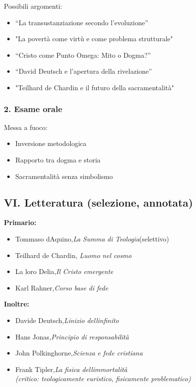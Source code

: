 \documentclass[
]{article}
\begin{document}
Possibili argomenti:

\begin{itemize}
\item
  ``La transustanziazione secondo l'evoluzione''
\item
  "La povertà come virtù e come problema strutturale"
\item
  ``Cristo come Punto Omega: Mito o Dogma?''
\item
  ``David Deutsch e l'apertura della rivelazione''
\item
  "Teilhard de Chardin e il futuro della sacramentalità"
\end{itemize}

\subsubsection{\texorpdfstring{\textbf{2. Esame orale}}{2. Esame orale}}\label{esame-orale}

Messa a fuoco:

\begin{itemize}
\item
  Inversione metodologica
\item
  Rapporto tra dogma e storia
\item
  Sacramentalità senza simbolismo
\end{itemize}

\subsection{\texorpdfstring{\textbf{VI. Letteratura (selezione, annotata)}}{VI. Letteratura (selezione, annotata)}}\label{vi.-letteratura-selezione-annotata}

\textbf{Primario:}

\begin{itemize}
\item
  Tommaso d\textquotesingle Aquino,\emph{La Summa di Teologia}(selettivo)
\item
  Teilhard de Chardin, \emph{L\textquotesingle uomo nel cosmo}
\item
  La loro Delia,\emph{Il Cristo emergente}
\item
  Karl Rahner,\emph{Corso base di fede}
\end{itemize}

\textbf{Inoltre:}

\begin{itemize}
\item
  Davide Deutsch,\emph{L\textquotesingle inizio dell\textquotesingle infinito}
\item
  Hans Jonas,\emph{Principio di responsabilità}
\item
  John Polkinghorne,\emph{Scienza e fede cristiana}
\item
  Frank Tipler,\emph{La fisica dell\textquotesingle immortalità\\
  (critico: teologicamente euristico, fisicamente problematico)}
\end{itemize}
\end{document}
